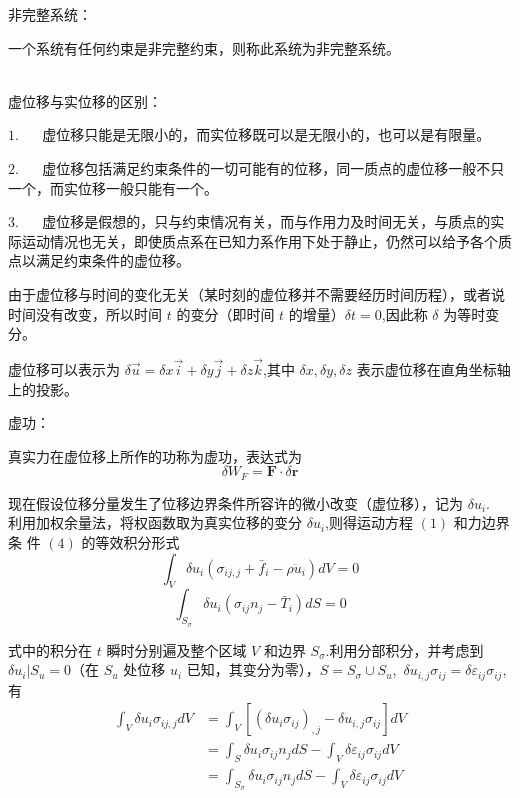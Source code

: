 \documentclass[12pt,a4paper]{article}
\begin{document}
非完整系统：

一个系统有任何约束是非完整约束，则称此系统为非完整系统。

~ \\

虚位移与实位移的区别：

$1$. ~~ 虚位移只能是无限小的，而实位移既可以是无限小的，也可以是有限量。

$2$. ~~ 虚位移包括满足约束条件的一切可能有的位移，同一质点的虚位移一般不只一个，而实位移一般只能有一个。

$3$. ~~ 虚位移是假想的，只与约束情况有关，而与作用力及时间无关，与质点的实际运动情况也无关，即使质点系在已知力系作用下处于静止，仍然可以给予各个质点以满足约束条件的虚位移。

由于虚位移与时间的变化无关（某时刻的虚位移并不需要经历时间历程），或者说时间没有改变，所以时间 $t$ 的变分（即时间 $t$ 的增量）$\delta t=0$,因此称 $\delta$ 为等时变分。

虚位移可以表示为 $\delta\vec{u}=\delta x\vec{i}+\delta y\vec{j}+\delta z\vec{k}$,其中 $\delta x,\delta y,\delta z$ 表示虚位移在直角坐标轴上的投影。

$\textbf{虚功}$：

真实力在虚位移上所作的功称为虚功，表达式为
$$
\delta W_F=\textbf{F}\cdot\delta\textbf{r}
$$

现在假设位移分量发生了位移边界条件所容许的微小改变（虚位移），记为 $\delta u_i$.\\


利用加权余量法，将权函数取为真实位移的变分 $\delta u_i$,则得运动方程 $(1)$ 和力边界条
件 $(4)$ 的等效积分形式
\begin{equation}
\int_{V}\delta u_i(\sigma_{ij,j}+\bar{f}_i-\rho\ddot{u}_i)dV=0
\end{equation}
\begin{equation}
\int_{S_{\sigma}}\delta u_i(\sigma_{ij}n_j-\bar{T}_i)dS=0
\end{equation}

式中的积分在 $t$ 瞬时分别遍及整个区域 $V$ 和边界 $S_{\sigma}$.利用分部积分，并考虑到 $\delta u_i|S_u=0$（在 $S_u$ 处位移 $u_i$ 已知，其变分为零），$S=S_{\sigma}\cup S_u$,~$\delta u_{i,j}\sigma_{ij}=\delta\varepsilon_{ij}\sigma_{ij}$,有
\begin{equation}
\begin{aligned}
\int_{V} \delta u_i\sigma_{ij,j}dV & = \int_{V} \left[(\delta u_i\sigma_{ij})_{,j}-\delta u_{i,j}\sigma_{ij}\right]dV \\
& = \int_{S} \delta u_i\sigma_{ij}n_jdS-\int_{V}\delta\varepsilon_{ij}\sigma_{ij}dV \\
& = \int_{S_{\sigma}} \delta u_i\sigma_{ij}n_jdS-\int_{V}\delta\varepsilon_{ij}\sigma_{ij}dV
\end{aligned}
\end{equation}
\end{document}
